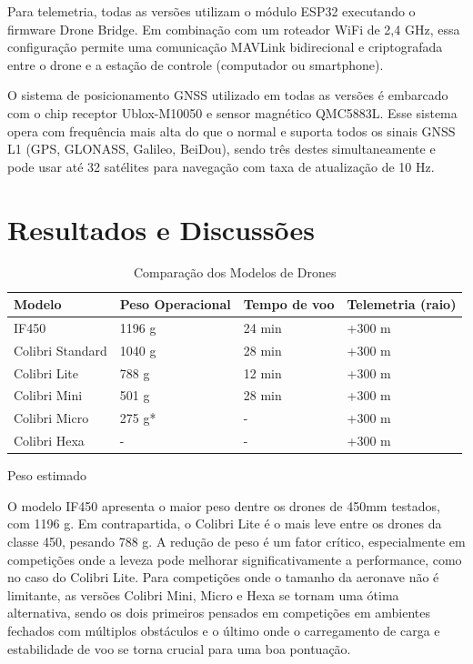 \documentclass[conference]{IEEEtran}
\begin{document}
Para telemetria, todas as versões utilizam o módulo ESP32 executando o firmware Drone Bridge. Em combinação com um roteador WiFi de 2,4 GHz, essa configuração permite uma comunicação MAVLink bidirecional e criptografada entre o drone e a estação de controle (computador ou smartphone).

O sistema de posicionamento GNSS utilizado em todas as versões é embarcado com o chip receptor Ublox-M10050 e sensor magnético QMC5883L. Esse sistema opera com frequência mais alta do que o normal e suporta todos os sinais GNSS L1 (GPS, GLONASS, Galileo, BeiDou), sendo três destes simultaneamente e pode usar até 32 satélites para navegação com taxa de atualização de 10 Hz.

\section{Resultados e Discussões}

\begin{table}[htbp]
\centering
\caption{Comparação dos Modelos de Drones}
\label{tab:drone_comparison}
\begin{tabularx}{\columnwidth}{|l|X|X|X|}
\hline
\textbf{Modelo}         & \textbf{Peso Operacional} & \textbf{Tempo de voo} & \textbf{Telemetria (raio)} \\ \hline
IF450                  & 1196 g                    & 24 min               & +300 m                     \\ \hline
Colibri Standard       & 1040 g                    & 28 min               & +300 m                     \\ \hline
Colibri Lite           & 788 g                     & 12 min               & +300 m                     \\ \hline
Colibri Mini           & 501 g                     & 28 min               & +300 m                     \\ \hline
Colibri Micro          & 275 g*                    & -                    & +300 m                     \\ \hline
Colibri Hexa           & -                         & -                    & +300 m                     \\ \hline
\end{tabularx}
\newline
\small *Peso estimado
\end{table}

O modelo IF450 apresenta o maior peso dentre os drones de 450mm testados, com 1196 g. Em contrapartida, o Colibri Lite é o mais leve entre os drones da classe 450, pesando 788 g. A redução de peso é um fator crítico, especialmente em competições onde a leveza pode melhorar significativamente a performance, como no caso do Colibri Lite. Para competições onde o tamanho da aeronave não é limitante, as versões Colibri Mini, Micro e Hexa se tornam uma ótima alternativa, sendo os dois primeiros pensados em competições em ambientes fechados com múltiplos obstáculos e o último onde o carregamento de carga e estabilidade de voo se torna crucial para uma boa pontuação.
\end{document}
